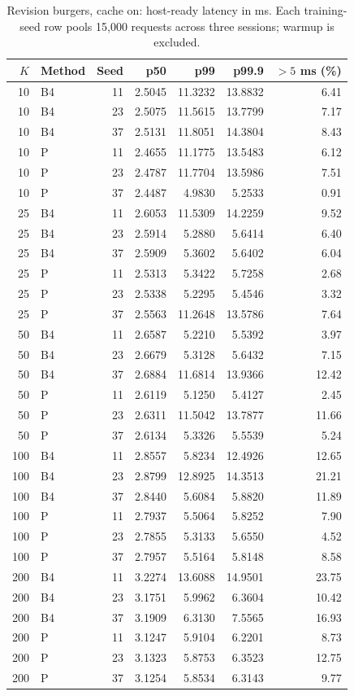 \begin{table}[ht]
\centering\small
\caption{Revision burgers, cache on: host-ready latency in ms. Each training-seed row pools 15,000 requests across three sessions; warmup is excluded.}\label{tab:e2_seed_burgers_on}
\begin{tabular}{@{}rlrrrrr@{}}\toprule
$K$ & Method & Seed & p50 & p99 & p99.9 & $>5$ ms (\%)\\\midrule
10 & B4 & 11 & 2.5045 & 11.3232 & 13.8832 & 6.41\\
10 & B4 & 23 & 2.5075 & 11.5615 & 13.7799 & 7.17\\
10 & B4 & 37 & 2.5131 & 11.8051 & 14.3804 & 8.43\\
10 & P & 11 & 2.4655 & 11.1775 & 13.5483 & 6.12\\
10 & P & 23 & 2.4787 & 11.7704 & 13.5986 & 7.51\\
10 & P & 37 & 2.4487 & 4.9830 & 5.2533 & 0.91\\
25 & B4 & 11 & 2.6053 & 11.5309 & 14.2259 & 9.52\\
25 & B4 & 23 & 2.5914 & 5.2880 & 5.6414 & 6.40\\
25 & B4 & 37 & 2.5909 & 5.3602 & 5.6402 & 6.04\\
25 & P & 11 & 2.5313 & 5.3422 & 5.7258 & 2.68\\
25 & P & 23 & 2.5338 & 5.2295 & 5.4546 & 3.32\\
25 & P & 37 & 2.5563 & 11.2648 & 13.5786 & 7.64\\
50 & B4 & 11 & 2.6587 & 5.2210 & 5.5392 & 3.97\\
50 & B4 & 23 & 2.6679 & 5.3128 & 5.6432 & 7.15\\
50 & B4 & 37 & 2.6884 & 11.6814 & 13.9366 & 12.42\\
50 & P & 11 & 2.6119 & 5.1250 & 5.4127 & 2.45\\
50 & P & 23 & 2.6311 & 11.5042 & 13.7877 & 11.66\\
50 & P & 37 & 2.6134 & 5.3326 & 5.5539 & 5.24\\
100 & B4 & 11 & 2.8557 & 5.8234 & 12.4926 & 12.65\\
100 & B4 & 23 & 2.8799 & 12.8925 & 14.3513 & 21.21\\
100 & B4 & 37 & 2.8440 & 5.6084 & 5.8820 & 11.89\\
100 & P & 11 & 2.7937 & 5.5064 & 5.8252 & 7.90\\
100 & P & 23 & 2.7855 & 5.3133 & 5.6550 & 4.52\\
100 & P & 37 & 2.7957 & 5.5164 & 5.8148 & 8.58\\
200 & B4 & 11 & 3.2274 & 13.6088 & 14.9501 & 23.75\\
200 & B4 & 23 & 3.1751 & 5.9962 & 6.3604 & 10.42\\
200 & B4 & 37 & 3.1909 & 6.3130 & 7.5565 & 16.93\\
200 & P & 11 & 3.1247 & 5.9104 & 6.2201 & 8.73\\
200 & P & 23 & 3.1323 & 5.8753 & 6.3523 & 12.75\\
200 & P & 37 & 3.1254 & 5.8534 & 6.3143 & 9.77\\
\bottomrule\end{tabular}
\end{table}

